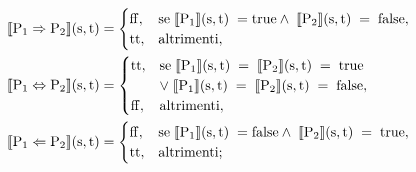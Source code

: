 \documentclass[a4paper, 12pt, oneside,fleqn]{book}
\begin{document}
\begin{align}
\llbracket \mathrm{P}{_1} \Rightarrow \mathrm{P}{_2}\rrbracket(\mathrm{s},\mathrm{t}) &=
        \begin{cases}
                \mathrm{ff}, &\text{se} \hspace{1mm}\llbracket \mathrm{P}{_1}\rrbracket(\mathrm{s},\mathrm{t})\hspace{1mm} = \mathrm{true} \wedge \hspace{1mm}                                       \llbracket \mathrm{P}{_2}\rrbracket(\mathrm{s},\mathrm{t})\hspace{1mm} = \hspace{1mm}\mathrm{false},   \\
                \mathrm{tt},   &\text{altrimenti},
        \end{cases} \\
\llbracket \mathrm{P}{_1} \Leftrightarrow \mathrm{P}{_2}\rrbracket(\mathrm{s},\mathrm{t}) &=
        \begin{cases}
                \mathrm{tt},&\text{se} \hspace{1mm}\llbracket \mathrm{P}{_1}\rrbracket(\mathrm{s},\mathrm{t})\hspace{1mm} = \hspace{1mm}\llbracket                                           \mathrm{P}{_2}\rrbracket(\mathrm{s},\mathrm{t})\hspace{1mm} = \hspace{1mm}\mathrm{true} \\
                        &\vee\hspace{1mm}\llbracket \mathrm{P}{_1}\rrbracket(\mathrm{s},\mathrm{t})\hspace{1mm} = \hspace{1mm}\llbracket \mathrm{P}{_2}                                                       \rrbracket(\mathrm{s},\mathrm{t})\hspace{1mm} = \hspace{1mm}\mathrm{false},  \\
           \mathrm{ff},&\text{altrimenti},
        \end{cases} \\
\llbracket \mathrm{P}{_1} \Leftarrow \mathrm{P}{_2}\rrbracket(\mathrm{s},\mathrm{t}) &=
        \begin{cases}
                \mathrm{ff},&\text{se} \hspace{1mm}\llbracket \mathrm{P}{_1}\rrbracket(\mathrm{s},\mathrm{t})\hspace{1mm} = \mathrm{false} \wedge \hspace{1mm}                                       \llbracket \mathrm{P}{_2}\rrbracket(\mathrm{s},\mathrm{t})\hspace{1mm} = \hspace{1mm}\mathrm{true},   \\
                \mathrm{tt},&\text{altrimenti};
   \end{cases}
\end{align}
\end{document}
